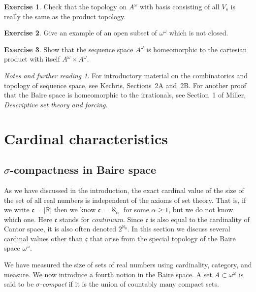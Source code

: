\documentclass[11pt,oneside]{amsbook}
\newcommand{\RR}{\mathbb R}
\theoremstyle{definition}
\newtheorem{exerc}{Exercise}[section]
\theoremstyle{plain}
\theoremstyle{definition}
\theoremstyle{remark}
\newtheorem*{notes}{Notes and further reading}
\numberwithin{equation}{section}
\numberwithin{figure}{section}
\begin{document}
\begin{exerc}
  Check that the topology on $A^\omega$ with basis consisting of all $V_s$ is really the same as the product topology.
\end{exerc}

\begin{exerc}
  Give an example of an open subset of $\omega^\omega$ which is not closed.
\end{exerc}

\begin{exerc}
  Show that the sequence space $A^\omega$ is homeomorphic to the cartesian product with itself $A^\omega\times A^\omega$.
\end{exerc}

\begin{notes}
  For introductory material on the combinatorics and topology of sequence space, see Kechris, Sections~2A and~2B. For another proof that the Baire space is homeomorphic to the irrationals, see Section~1 of Miller, \emph{Descriptive set theory and forcing}.
\end{notes}


\chapter{Cardinal characteristics}

\section{$\sigma$-compactness in Baire space}

As we have discussed in the introduction, the exact cardinal value of the size of the set of all real numbers is independent of the axioms of set theory. That is, if we write $\mathfrak c=|\RR|$ then we know $\mathfrak c=\aleph_\alpha$ for some $\alpha\geq1$, but we do not know which one. Here $\mathfrak c$ stands for \emph{continuum}. Since $\mathfrak c$ is also equal to the cardinality of Cantor space, it is also often denoted $2^{\aleph_0}$. In this section we discuss several cardinal values other than $\mathfrak c$ that arise from the special topology of the Baire space $\omega^\omega$.

We have measured the size of sets of real numbers using cardinality, category, and measure. We now introduce a fourth notion in the Baire space. A set $A\subset\omega^\omega$ is said to be \emph{$\sigma$-compact} if it is the union of countably many compact sets.
\end{document}
